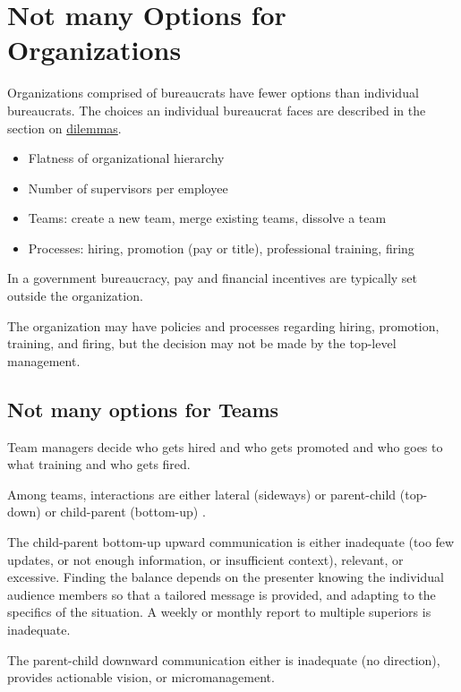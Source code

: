 \section{Not many Options for Organizations}

Organizations comprised of bureaucrats have fewer options than individual bureaucrats. The choices an individual bureaucrat faces are described in the section on \hyperref[sec:dilemma-trilemma]{dilemmas}.
\begin{itemize}
    \item Flatness of organizational hierarchy
    \item Number of supervisors per employee
    \item Teams: create a new team, merge existing teams, dissolve a team
    \item Processes: hiring, promotion (pay or title), professional training, firing
\end{itemize}
In a government bureaucracy, pay and financial incentives are typically set outside the organization.

The organization may have policies and processes regarding hiring, promotion, training, and firing, but the decision may not be made by the top-level management. 

\subsection*{Not many options for Teams}

Team managers decide who gets hired and who gets promoted and who goes to what training and who gets fired.

Among teams, interactions are either lateral (sideways) or parent-child (top-down) or child-parent (bottom-up) \cite{2014_Jorgensen}.

The child-parent bottom-up upward communication is either inadequate (too few updates, or not enough information, or insufficient context), relevant, or excessive. Finding the balance depends on the presenter knowing the individual audience members so that a tailored message is provided, and adapting to the specifics of the situation. A weekly or monthly report to multiple superiors is inadequate. 

The parent-child downward communication either is inadequate (no direction), provides actionable vision, or micromanagement. 

